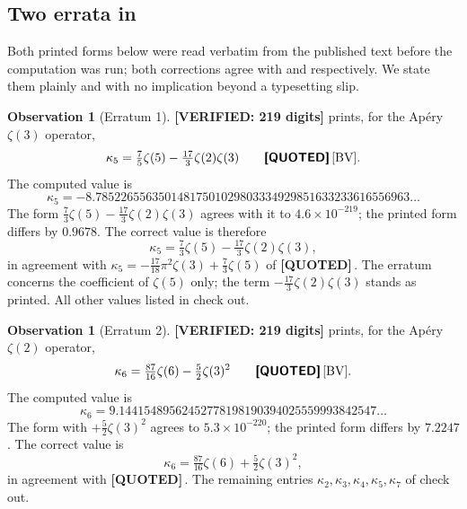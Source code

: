 \documentclass[11pt,reqno]{amsart}
\theoremstyle{plain}
\theoremstyle{definition}
\newtheorem{observation}[theorem]{Observation}
\theoremstyle{remark}
\newcommand{\VER}[1]{{\normalfont\sffamily\bfseries[VERIFIED: #1]}}
\newcommand{\QUOTEDMARK}{{\normalfont\sffamily\bfseries[QUOTED]}}
\newcommand{\QUOTED}[1]{\QUOTEDMARK\,#1}
\begin{document}
\subsection{Two errata in \texorpdfstring{\cite{BV}}{[BV]}}\label{sec:errata}
Both printed forms below were read verbatim from the published text before the computation was
run; both corrections agree with \cite[(47)]{GZ2} and \cite[Table 2]{RV} respectively. We state
them plainly and with no implication beyond a typesetting slip.

\begin{observation}[Erratum 1]\label{obs:err1} \VER{219 digits}
\cite[Example 29]{BV} prints, for the Ap\'ery $\zeta(3)$ operator,
\[
  \kappa_5=\tfrac{7}{5}\zeta(5)-\tfrac{17}{3}\zeta(2)\zeta(3)
  \qquad\text{\QUOTED{\cite[Ex.~29]{BV}}}.
\]
The computed value is
\[
  \kappa_5=-8.78522655635014817501029803334929851633233616556963\ldots
\]
The form $\tfrac{7}{3}\zeta(5)-\tfrac{17}{3}\zeta(2)\zeta(3)$ agrees with it to
$4.6\times10^{-219}$; the printed form differs by $0.9678$. The correct value is therefore
\[
  \kappa_5=\tfrac{7}{3}\zeta(5)-\tfrac{17}{3}\zeta(2)\zeta(3),
\]
in agreement with $\kappa_5=-\tfrac{17}{18}\pi^2\zeta(3)+\tfrac{7}{3}\zeta(5)$ of
\QUOTED{\cite[(47)]{GZ2}}. The erratum concerns the coefficient of $\zeta(5)$ only; the term
$-\tfrac{17}{3}\zeta(2)\zeta(3)$ stands as printed. All other values listed in
\cite[Ex.~29]{BV} check out.
\end{observation}

\begin{observation}[Erratum 2]\label{obs:err2} \VER{219 digits}
\cite[Example 28]{BV} prints, for the Ap\'ery $\zeta(2)$ operator,
\[
  \kappa_6=\tfrac{87}{16}\zeta(6)-\tfrac{5}{2}\zeta(3)^2
  \qquad\text{\QUOTED{\cite[Ex.~28]{BV}}}.
\]
The computed value is
\[
  \kappa_6=9.14415489562452778198190394025559993842547\ldots
\]
The form with $+\tfrac{5}{2}\zeta(3)^2$ agrees to $5.3\times10^{-220}$; the printed form differs
by $7.2247$. The correct value is
\[
  \kappa_6=\tfrac{87}{16}\zeta(6)+\tfrac{5}{2}\zeta(3)^2,
\]
in agreement with \QUOTED{\cite[Table 2, case D]{RV}}. The remaining entries
$\kappa_2,\kappa_3,\kappa_4,\kappa_5,\kappa_7$ of \cite[Ex.~28]{BV} check out.
\end{observation}
\end{document}
